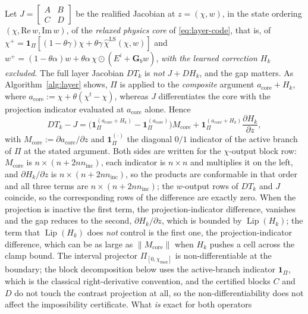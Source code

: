 \documentclass[journal,cmes,article,submit,moreauthors,pdftex]{Definitions/tsp}
\newcommand{\norm}[1]{\lVert #1 \rVert}
\begin{document}
\begin{Lemma}\label{lem:blocks}
Let $J=\left[\begin{smallmatrix}A&B\\ C&D\end{smallmatrix}\right]$ be the realified Jacobian at
$z=(\chi,w)$, in the state ordering
$(\chi,\mathrm{Re}\,w,\mathrm{Im}\,w)$, of the \emph{relaxed physics core} of
\eqref{eq:layer-code}, that is, of
$\chi^{+}=\mathbf{1}_{\Pi}[(1-\theta\gamma)\chi+\theta\gamma\,\hat\chi^{\mathrm{LS}}(\chi,w)]$
and $w^{+}=(1-\theta\alpha)w+\theta\alpha\,\chi\odot(E^{i}+\mathbf{G}_b w)$, \emph{with the
learned correction $H_k$ excluded}. The full layer Jacobian $DT_k$ is \emph{not} $J+DH_k$, and the gap matters. As Algorithm~\ref{alg:layer} shows, $\Pi$ is applied to the
\emph{composite} argument $a_{\mathrm{core}}+H_k$, where
$a_{\mathrm{core}}:=\chi+\theta(\chi^{t}-\chi)$, whereas $J$ differentiates the core with the
projection indicator evaluated at $a_{\mathrm{core}}$ alone. Hence
\begin{equation}\label{eq:dTvsJ}
DT_k-J=\Big(\mathbf{1}_{\Pi}^{(a_{\mathrm{core}}+H_k)}-\mathbf{1}_{\Pi}^{(a_{\mathrm{core}})}\Big)M_{\mathrm{core}}+\mathbf{1}_{\Pi}^{(a_{\mathrm{core}}+H_k)}\frac{\partial H_k}{\partial z},
\end{equation}
with $M_{\mathrm{core}}:=\partial a_{\mathrm{core}}/\partial z$ and
$\mathbf{1}_{\Pi}^{(\cdot)}$ the diagonal $0/1$ indicator of the active branch of $\Pi$ at the
stated argument. Both sides are written for the $\chi$-output block row: $M_{\mathrm{core}}$ is
$n\times(n+2nn_{\mathrm{inc}})$, each indicator is $n\times n$ and multiplies it on the left, and
$\partial H_k/\partial z$ is $n\times(n+2nn_{\mathrm{inc}})$, so the products are conformable in
that order and all three terms are $n\times(n+2nn_{\mathrm{inc}})$; the $w$-output rows of $DT_k$
and $J$ coincide, so the corresponding rows of the difference are exactly zero. When the projection is inactive the first term, the projection-indicator difference, vanishes and the gap reduces to the second, $\partial H_k/\partial z$, which is bounded
by $\operatorname{Lip}(H_k)$; the term that $\operatorname{Lip}(H_k)$ does \emph{not} control is the
first one, the projection-indicator difference, which can be as large as $\norm{M_{\mathrm{core}}}$
when $H_k$ pushes a cell across the clamp bound. The interval projector $\Pi_{[0,\chi_{\max}]}$ is non-differentiable at the boundary; the block decomposition below uses the active-branch indicator $\mathbf{1}_{\Pi}$, which is the classical right-derivative convention, and the certified blocks $C$ and $D$ do not touch the contrast projection at all, so the non-differentiability does not affect the impossibility certificate. What \emph{is} exact for both operators

\end{Lemma}
\end{document}
